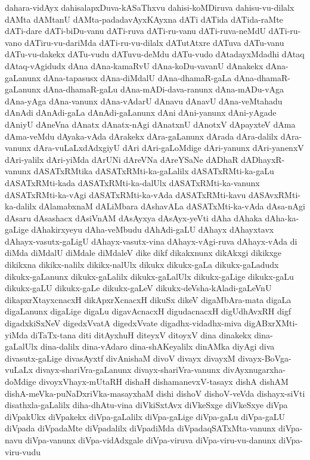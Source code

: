 {dahara-vidAyx
dahisalapxDuva-kASaThxvu
dahisi-koMDiruva
dahisu-vu-dilalx
dAMta
dAMtanU
dAMta-padadavAyxKAyxna
dATi
dATida
dATida-raMte
dATi-dare
dATi-biDu-vanu
dATi-ruva
dATi-ru-vanu
dATi-ruva-neMdU
dATi-ru-vano
dATiru-vu-dariMda
dATi-ru-vu-dilalx
dATutAtxre
dATuva
dATu-vanu
dATu-vu-dakekx
dATu-vudu
dATuvu-deMdu
dATu-vudo
dAtadayxMdadhi
dAtaq
dAtaq-vAgidudx
dAna
dAna-kamaRvU
dAna-koDu-vavanU
dAnakekx
dAna-gaLanunx
dAna-tapasusx
dAna-diMdalU
dAna-dhamaR-gaLa
dAna-dhamaR-gaLanunx
dAna-dhamaR-gaLu
dAna-mADi-dava-ranunx
dAna-mADu-vAga
dAna-yAga
dAna-vanunx
dAna-vAdarU
dAnavu
dAnavU
dAna-veMtahadu
dAnAdi
dAnAdi-gaLa
dAnAdi-gaLanunx
dAni
dAni-yanunx
dAni-yAgade
dAniyU
dAneVna
dAnatx
dAnatx-nAgi
dAnatxnU
dAnotxV
dApayxteV
dAma
dAma-veMdu
dAyaka-vAda
dArakekx
dAra-gaLanunx
dArada
dAra-dalilx
dAra-vanunx
dAra-vuLaLxdAdxgiyU
dAri
dAri-gaLoMdige
dAri-yanunx
dAri-yanenxV
dAri-yalilx
dAri-yiMda
dArUNi
dAreVNa
dAreYSaNe
dADhaR
dADhayxR-vanunx
dASATxRMtika
dASATxRMti-ka-gaLalilx
dASATxRMti-ka-gaLu
dASATxRMti-kada
dASATxRMti-ka-dalUlx
dASATxRMti-ka-vanunx
dASATxRMti-ka-vAgi
dASATxRMti-ka-vAda
dASATxRMti-kavu
dASAvxRMti-ka-dalilx
dAlamabxnaM
dALiMbara
dAshavALa
dASATxMti-ka-vAda
dAsa-nAgi
dAsaru
dAsashacx
dAsiVnAM
dAsAyxya
dAsAyx-yeVti
dAha
dAhaka
dAha-ka-gaLige
dAhakirxyeyu
dAha-veMbudu
dAhAdi-gaLU
dAhayx
dAhayxtavx
dAhayx-vasutx-gaLigU
dAhayx-vasutx-vina
dAhayx-vAgi-ruva
dAhayx-vAda
di
diMda
diMdalU
diMdale
diMdaleV
dike
dikf
dikakxnunx
dikAkxgi
dikikxge
dikikxna
dikikx-nalilx
dikikx-nalUlx
dikukx
dikukx-gaLa
dikukx-gaLadudx
dikukx-gaLanunx
dikukx-gaLalilx
dikukx-gaLalUlx
dikukx-gaLige
dikukx-gaLu
dikukx-gaLU
dikukx-gaLe
dikukx-gaLeV
dikukx-deVsha-kAladi-gaLeVnU
dikapxrXtayxcnacxH
dikApxrXcnacxH
dikuSx
dikeV
digaMbAra-mata
digaLa
digaLanunx
digaLige
digaLu
digavAcnacxH
digudacnacxH
digUdhAvxRH
digf
digadxkiSxNeV
digedxVvatA
digedxVvate
digadhx-vidadhx-miva
digABxrXMti-yiMda
diTaTx-tana
diti
ditAyxhuH
diteyxV
ditoyxV
dina
dinakekx
dina-gaLalUlx
dina-dalilx
dina-vAdaro
dina-shAKeyalilx
dinAMka
diyAgi
diva
divasutx-gaLige
divasAyxtf
divAnishaM
divoV
divayx
divayxM
divayx-BoVga-vuLaLx
divayx-shariVra-gaLanunx
divayx-shariVra-vanunx
divAyxnugarxha-doMdige
divoyxVhayx-mUtaRH
dishaH
dishamanevxV-tasayx
dishA
dishAM
dishA-meVka-puNaDxriVka-masayxhaM
dishi
dishoV
dishoV-veVda
dishayx-siVti
disathxla-gaLalilx
diha-dhAtu-vina
diVkiSxtAvx
diVkeSxge
diVkeSxye
diVpa
diVpakUkx
diVpakekx
diVpa-gaLalilx
diVpa-gaLige
diVpa-gaLu
diVpa-gaLU
diVpada
diVpadaMte
diVpadalilx
diVpadiMda
diVpadaqSATxMta-vanunx
diVpa-navu
diVpa-vanunx
diVpa-vidAdxgale
diVpa-viruva
diVpa-viru-vu-danunx
diVpa-viru-vudu
}
